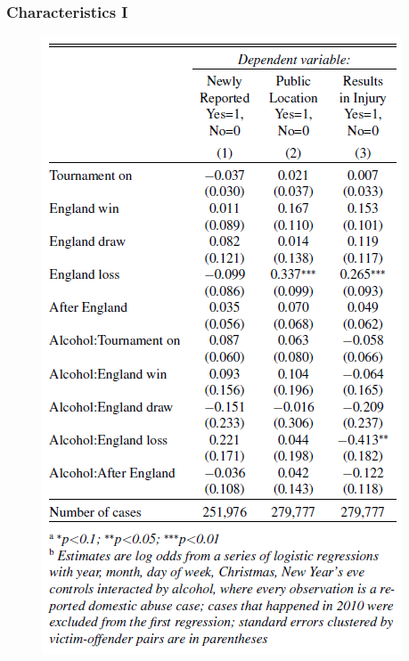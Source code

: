 \documentclass[hyperref={pdfpagelabels=false}]{beamer}
\begin{document}
\begin{frame}
\frametitle{Characteristics I}
\begin{center}
\begin{figure}
\includegraphics[scale=0.45]{append2.png}
\end{figure}
\end{center}
\end{frame}
\end{document}
